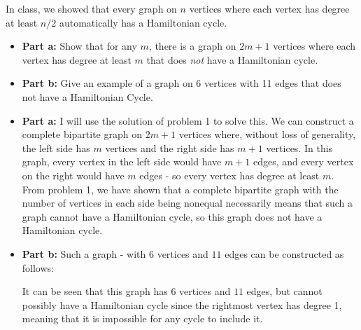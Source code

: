 \documentclass{article}
\begin{document}
\begin{problem} In class, we showed that every graph on $n$ vertices where each vertex has degree at least $n/2$ automatically has a Hamiltonian cycle.
\begin{itemize}
	\item[]{\textbf{Part a:}} Show that for any $m$, there is a graph on $2m+1$ vertices where each vertex has degree at least $m$ that does \emph{not} have a Hamiltonian cycle.
	\item[]{\textbf{Part b:}} Give an example of a graph on 6 vertices with 11 edges that does not have a Hamiltonian Cycle.
\end{itemize}
\end{problem}

\begin{solution}
\begin{itemize}
	\item[]{\textbf{Part a:}} I will use the solution of problem 1 to solve this.  We can construct a complete bipartite graph on $2m+1$ vertices where, without loss of generality, the left side has $m$ vertices and the right side has $m+1$ vertices.  In this graph, every vertex in the left side would have $m+1$ edges, and every vertex on the right would have $m$ edges - so every vertex has degree at least $m$.  From problem 1, we have shown that a complete bipartite graph with the number of vertices in each side being nonequal necessarily means that such a graph cannot have a Hamiltonian cycle, so this graph does not have a Hamiltonian cycle.
	\item[]{\textbf{Part b:}} Such a graph - with $6$ vertices and $11$ edges can be constructed as follows:
	\newline\noindent
	\vskip 0.15in\noindent
	It can be seen that this graph has $6$ vertices and $11$ edges, but cannot possibly have a Hamiltonian cycle since the rightmost vertex has degree 1, meaning that it is impossible for any cycle to include it.
\end{itemize}
\end{solution}
\end{document}
